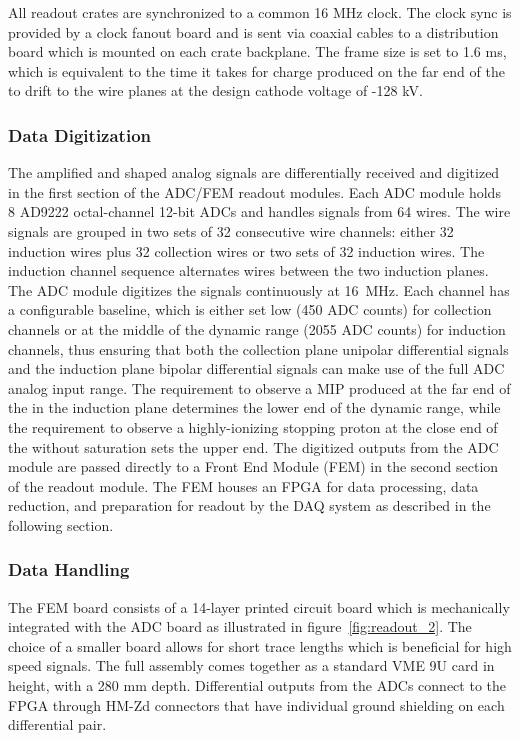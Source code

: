 All readout crates are synchronized to a common 16 MHz clock. The clock sync is provided by a clock fanout board and is sent via coaxial cables to a distribution board which is mounted on each crate backplane. The frame size is set to 1.6 ms, which is equivalent to the time it takes for charge produced on the far end of the \lartpc to drift to the wire planes at the design cathode voltage of -128 kV.

\subsubsection{\label{sssec:tpcdigitization} Data Digitization}

The amplified and shaped analog \lartpc signals are differentially received and digitized in the first section of the ADC/FEM readout modules. Each ADC module holds 8 AD9222 octal-channel 12-bit ADCs and handles signals from 64 wires. The wire signals are grouped in two sets of 32 consecutive wire channels: either 32 induction wires plus 32 collection wires or two sets of 32 induction wires. The induction channel sequence alternates wires between the two induction planes. The ADC module digitizes the signals continuously at 16~MHz. Each channel has a configurable baseline, which is either set low (450 ADC counts) for collection channels or at the middle of the dynamic range (2055 ADC counts) for induction channels, thus ensuring that both the collection plane unipolar differential signals and the induction plane bipolar differential signals can make use of the full ADC analog input range. The requirement to observe a MIP produced at the far end of the \lartpc in the induction plane determines the lower end of the dynamic range, while the requirement to observe a highly-ionizing stopping proton at the close end of the \lartpc without saturation sets the upper end. The digitized outputs from the ADC module are passed directly to a Front End Module (FEM) in the second section of the \lartpc readout module. The FEM houses an FPGA for data processing, data reduction, and preparation for readout by the DAQ system as described in the following section. 

\subsubsection{\label{sssec:tpcFEM} Data Handling}

The FEM board consists of a 14-layer printed circuit board which is mechanically integrated with the ADC board as illustrated in figure~\ref{fig:readout_2}. The choice of a smaller board allows for short trace lengths which is beneficial for high speed signals. The full assembly comes together as a standard VME 9U card in height, with a 280 mm depth. Differential outputs from the ADCs connect to the FPGA through HM-Zd connectors that have individual ground shielding on each differential pair. 

